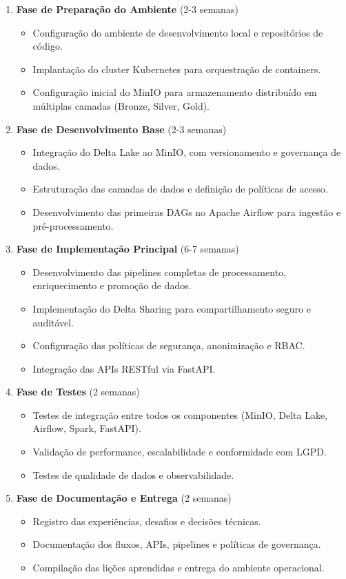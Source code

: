\begin{enumerate}
    \item \textbf{Fase de Preparação do Ambiente} (2-3 semanas)
    \begin{itemize}
        \item Configuração do ambiente de desenvolvimento local e repositórios de código.
        \item Implantação do cluster Kubernetes para orquestração de containers.
        \item Configuração inicial do MinIO para armazenamento distribuído em múltiplas camadas (Bronze, Silver, Gold).
    \end{itemize}
    \item \textbf{Fase de Desenvolvimento Base} (2-3 semanas)
    \begin{itemize}
        \item Integração do Delta Lake ao MinIO, com versionamento e governança de dados.
        \item Estruturação das camadas de dados e definição de políticas de acesso.
        \item Desenvolvimento das primeiras DAGs no Apache Airflow para ingestão e pré-processamento.
    \end{itemize}
    \item \textbf{Fase de Implementação Principal} (6-7 semanas)
    \begin{itemize}
        \item Desenvolvimento das pipelines completas de processamento, enriquecimento e promoção de dados.
        \item Implementação do Delta Sharing para compartilhamento seguro e auditável.
        \item Configuração das políticas de segurança, anonimização e RBAC.
        \item Integração das APIs RESTful via FastAPI.
    \end{itemize}
    \item \textbf{Fase de Testes} (2 semanas)
    \begin{itemize}
        \item Testes de integração entre todos os componentes (MinIO, Delta Lake, Airflow, Spark, FastAPI).
        \item Validação de performance, escalabilidade e conformidade com LGPD.
        \item Testes de qualidade de dados e observabilidade.
    \end{itemize}
    \item \textbf{Fase de Documentação e Entrega} (2 semanas)
    \begin{itemize}
        \item Registro das experiências, desafios e decisões técnicas.
        \item Documentação dos fluxos, APIs, pipelines e políticas de governança.
        \item Compilação das lições aprendidas e entrega do ambiente operacional.
    \end{itemize}
\end{enumerate}

